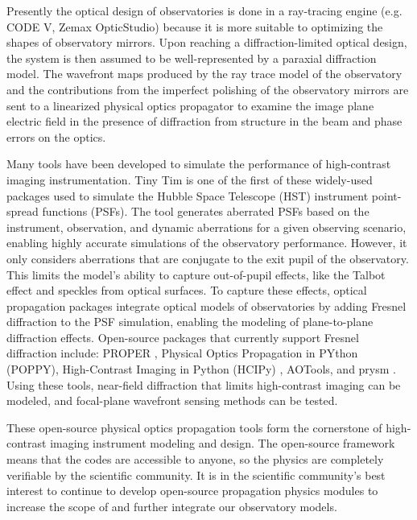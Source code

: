 Presently the optical design of observatories is done in a ray-tracing engine\cite{Howard22,Howard11} (e.g. CODE V, Zemax OpticStudio) because it is more suitable to optimizing the shapes of observatory mirrors. Upon reaching a diffraction-limited optical design, the system is then assumed to be well-represented by a paraxial diffraction model. The wavefront maps produced by the ray trace model of the observatory and the contributions from the imperfect polishing of the observatory mirrors are sent to a linearized physical optics propagator to examine the image plane electric field in the presence of diffraction from structure in the beam and phase errors on the optics. 

Many tools have been developed to simulate the performance of high-contrast imaging instrumentation. Tiny Tim is one of the first of these widely-used packages used to simulate the Hubble Space Telescope (HST)  instrument point-spread functions (PSFs)\cite{Krist93}. The tool generates aberrated PSFs based on the instrument, observation, and dynamic aberrations for a given observing scenario, enabling highly accurate simulations of the observatory performance. However, it only considers aberrations that are conjugate to the exit pupil of the observatory. This limits the model's ability to capture out-of-pupil effects, like the Talbot effect and speckles from optical surfaces\cite{goodman17}. To capture these effects, optical propagation packages integrate optical models of observatories by adding Fresnel diffraction to the PSF simulation, enabling the modeling of plane-to-plane diffraction effects. Open-source packages that currently support Fresnel diffraction include: PROPER \cite{Krist07}, Physical Optics Propagation in PYthon (POPPY)\cite{Perrin12,2016ascl.soft02018P,Doug18}, High-Contrast Imaging in Python (HCIPy) \cite{por2018hcipy}, AOTools\cite{Townson:19}, and prysm \cite{Dube2022,Dube2019}. Using these tools, near-field diffraction that limits high-contrast imaging can be modeled, and focal-plane wavefront sensing methods can be tested. 

These open-source physical optics propagation tools form the cornerstone of high-contrast imaging instrument modeling and design. The open-source framework means that the codes are accessible to anyone, so the physics are completely verifiable by the scientific community\cite{Allen2021OpenSource}. It is in the scientific community's best interest to continue to develop open-source propagation physics modules to increase the scope of and further integrate our observatory models. 

